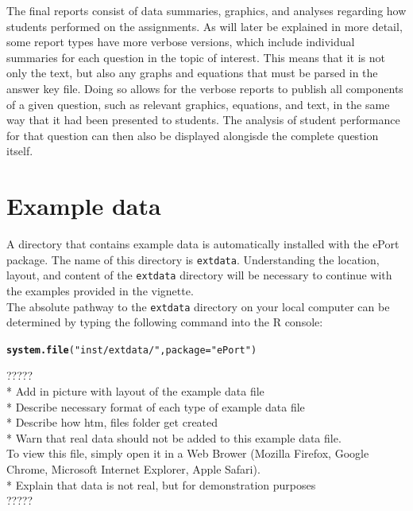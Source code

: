 \documentclass{article}\usepackage[]{graphicx}\usepackage[]{color}
\makeatletter
\newcommand{\hlstr}[1]{\textcolor[rgb]{0.192,0.494,0.8}{#1}}%
\newcommand{\hlstd}[1]{\textcolor[rgb]{0.345,0.345,0.345}{#1}}%
\newcommand{\hlkwc}[1]{\textcolor[rgb]{0.333,0.667,0.333}{#1}}%
\newcommand{\hlkwd}[1]{\textcolor[rgb]{0.737,0.353,0.396}{\textbf{#1}}}%
\newenvironment{kframe}{%
 \def\at@end@of@kframe{}%
 \ifinner\ifhmode%
  \def\at@end@of@kframe{\end{minipage}}%
  \begin{minipage}{\columnwidth}%
 \fi\fi%
 \def\FrameCommand##1{\hskip\@totalleftmargin \hskip-\fboxsep
 \colorbox{shadecolor}{##1}\hskip-\fboxsep
     \hskip-\linewidth \hskip-\@totalleftmargin \hskip\columnwidth}%
 \MakeFramed {\advance\hsize-\width
   \@totalleftmargin\z@ \linewidth\hsize
   \@setminipage}}%
 {\par\unskip\endMakeFramed%
 \at@end@of@kframe}
\newenvironment{knitrout}{}{} %
\numberwithin{equation}{section} %
\makeatother
\begin{document}
The final reports consist of data summaries, graphics, and analyses regarding how students performed on the assignments. As will later be explained in more detail, some report types have more verbose versions, which include individual summaries for each question in the topic of interest. This means that it is not only the text, but also any graphs and equations that must be parsed in the answer key file. Doing so allows for the verbose reports to publish all components of a given question, such as relevant graphics, equations, and text, in the same way that it had been presented to students. The analysis of student performance for that question can then also be displayed alongisde the complete question itself.

\section{Example data}

A directory that contains example data is automatically installed with the ePort package. The name of this directory is \texttt{extdata}. Understanding the location, layout, and content of the \texttt{extdata} directory will be necessary to continue with the examples provided in the vignette. \\

The absolute pathway to the \texttt{extdata} directory on your local computer can be determined by typing the following command into the R console:

\begin{knitrout}
\color{fgcolor}\begin{kframe}
\begin{alltt}
\hlkwd{system.file}\hlstd{(}\hlstr{"inst/extdata/"}\hlstd{,} \hlkwc{package} \hlstd{=} \hlstr{"ePort"}\hlstd{)}
\end{alltt}
\end{kframe}
\end{knitrout}

?????\\
* Add in picture with layout of the example data file  \\
* Describe necessary format of each type of example data file \\ 
* Describe how htm, files folder get created \\
* Warn that real data should not be added to this example data file.\\
To view this file, simply open it in a Web Brower (Mozilla Firefox, Google Chrome, Microsoft Internet Explorer, Apple Safari). \\
* Explain that data is not real, but for demonstration purposes\\
?????\\
\end{document}
